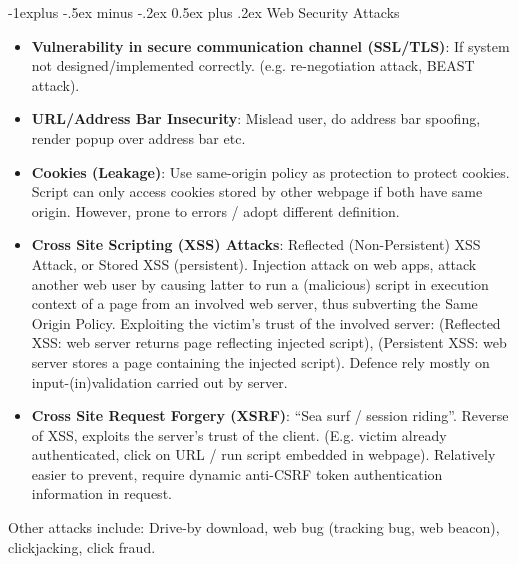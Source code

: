 \documentclass[10pt, landscape]{article}
\makeatletter
\renewcommand{\subsection}{\@startsection{subsection}{2}{0mm}%
                                {-1explus -.5ex minus -.2ex}%
                                {0.5ex plus .2ex}%
                                {\normalfont\normalsize\bfseries}}
\makeatother
\begin{document}
\begin{multicols*}{3}
\subsection{Web Security Attacks}
\begin{itemize}
\item \textbf{Vulnerability in secure communication channel (SSL/TLS)}: If system not designed/implemented correctly. (e.g. re-negotiation attack, BEAST attack).
\item \textbf{URL/Address Bar Insecurity}: Mislead user, do address bar spoofing, render popup over address bar etc. 
\item \textbf{Cookies (Leakage)}: Use same-origin policy as protection to protect cookies. Script can only access cookies stored by other webpage if both have same origin. However, prone to errors / adopt different definition.
\item \textbf{Cross Site Scripting (XSS) Attacks}: Reflected (Non-Persistent) XSS Attack, or Stored XSS (persistent). Injection attack on web apps, attack another web user by causing latter to run a (malicious) script in execution context of a page from an involved web server, thus subverting the Same Origin Policy. Exploiting the victim’s trust of the involved server: (Reflected XSS: web server returns page reflecting injected script), (Persistent XSS: web server stores a page containing the injected script). Defence rely mostly on input-(in)validation carried out by server.
\item \textbf{Cross Site Request Forgery (XSRF)}: ``Sea surf / session riding''. Reverse of XSS, exploits the server’s trust of the client. (E.g. victim already authenticated, click on URL / run script embedded in webpage). Relatively easier to prevent, require dynamic anti-CSRF token authentication information in request.
\end{itemize}
Other attacks include: Drive-by download, web bug (tracking bug, web beacon), clickjacking, click fraud.

































\end{multicols*}
\end{document}
